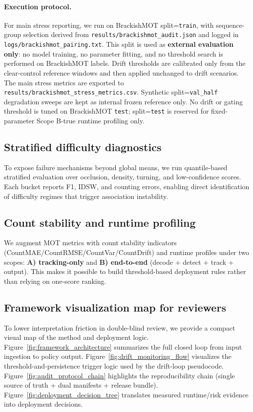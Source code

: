 \documentclass[5p,twocolumn,a4paper]{elsarticle}
\begin{document}
\paragraph{Execution protocol.}
For main stress reporting, we run on BrackishMOT split=\texttt{train}, with sequence-group selection derived from \texttt{results/brackishmot\_audit.json} and logged in \texttt{logs/brackishmot\_pairing.txt}. This split is used as \textbf{external evaluation only}: no model training, no parameter fitting, and no threshold search is performed on BrackishMOT labels. Drift thresholds are calibrated only from the clear-control reference windows and then applied unchanged to drift scenarios. The main stress metrics are exported to \texttt{results/brackishmot\_stress\_metrics.csv}. Synthetic split=\texttt{val\_half} degradation sweeps are kept as internal frozen reference only.
No drift or gating threshold is tuned on BrackishMOT \texttt{test}; split=\texttt{test} is reserved for fixed-parameter Scope B-true runtime profiling only.

\subsection{Stratified difficulty diagnostics}
To expose failure mechanisms beyond global means, we run quantile-based stratified evaluation over occlusion, density, turning, and low-confidence scores. Each bucket reports F1, IDSW, and counting errors, enabling direct identification of difficulty regimes that trigger association instability.

\subsection{Count stability and runtime profiling}
We augment MOT metrics with count stability indicators (CountMAE/CountRMSE/CountVar/CountDrift) and runtime profiles under two scopes: \textbf{A) tracking-only} and \textbf{B) end-to-end} (decode + detect + track + output). This makes it possible to build threshold-based deployment rules rather than relying on one-score ranking.

\subsection{Framework visualization map for reviewers}
To lower interpretation friction in double-blind review, we provide a compact visual map of the method and deployment logic. Figure~\ref{fig:framework_architecture} summarizes the full closed loop from input ingestion to policy output. Figure~\ref{fig:drift_monitoring_flow} visualizes the threshold-and-persistence trigger logic used by the drift-loop pseudocode. Figure~\ref{fig:audit_protocol_chain} highlights the reproducibility chain (single source of truth + dual manifests + release bundle). Figure~\ref{fig:deployment_decision_tree} translates measured runtime/risk evidence into deployment decisions.
\end{document}
